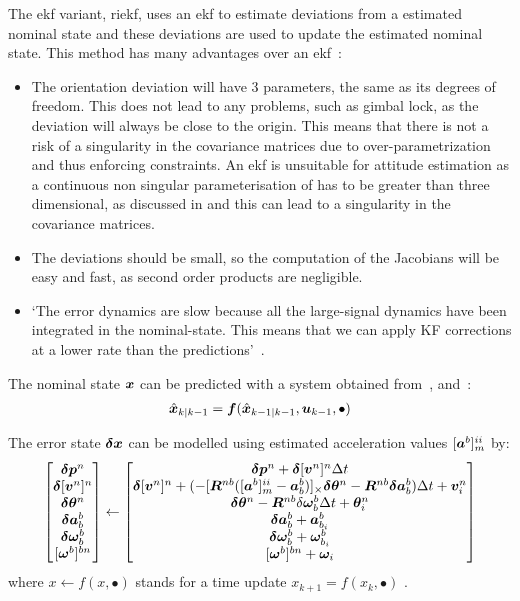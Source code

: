 The \gls{ekf} variant, \gls{riekf}, uses an \gls{ekf} to estimate deviations from a estimated nominal state and these deviations are used to update the estimated nominal state. This method has many advantages over an \gls{ekf}~\cite{Sol2017, Mad2011, Crassidis2003}:
\begin{itemize}
    \item The orientation deviation will have 3 parameters, the same as its degrees of freedom.
    This does not lead to any problems, such as gimbal lock, as the deviation will always be close to the origin.
    This means that there is not a risk of a singularity in the covariance matrices due to over-parametrization and thus enforcing constraints.
    An \gls{ekf} is unsuitable for \gls{attitude} estimation as a continuous non singular parameterisation of  has to be greater than three dimensional, as discussed in  and this can lead to a singularity in the covariance matrices.
    \item The deviations should be small, so the computation of the Jacobians will be easy and fast, as second order products are negligible.
    \item `The error dynamics are slow because all the large-signal dynamics have been integrated in the nominal-state. This means that we can apply KF corrections at a lower rate than the predictions'~\cite{Sol2017}.
\end{itemize}

The nominal state $\bm x$ can be predicted with a system obtained from~, and~:
\begin{align}
    \hat{\bm{x}}_{k \mid k-1} = \bm f(\hat{\bm{x}}_{k-1 \mid k-1}, \bm u_{k-1}, \bullet)
\end{align}

The error state $\bm \delta \bm x$ can be modelled using estimated acceleration values $[\bm a^b]^{ii}_m$ by:
\begin{align}
    \begin{bmatrix}
        \bd p^n \\
        \m \delta [\m v^n]^n \\
        \bd \theta^n \\
        \bd a^b_b \\
        \bd \omega^b_b \\
        [\m \omega^b]^{bn}
    \end{bmatrix} \gets
    \begin{bmatrix}
        \bd p^n + \m \delta [\m v^n]^n \Delta t \\
        \m \delta [\m v^n]^n + (-[\m{R}^{nb}([\m a^b]^{ii}_m - \m a^b_b)]_\times \bd \theta^n - \m{R}^{nb} \bd a^b_b) \Delta t + \m v^n_i \\
        \bd \theta^n - \m{R}^{nb} \delta \m{\omega}^b_b \Delta t + \m \theta^n_i \\
        \bd a^b_b + \m a^b_{b_i} \\
        \bd \omega^b_b + \m{\omega}^b_{b_i} \\
        [\m \omega^b]^{bn} + \m{\omega}_i
    \end{bmatrix}
\end{align}
where $x\gets f(x,\bullet)$ stands for a time update $x_{k+1} = f(x_k,\bullet)$ \cite{Sol2017}.

